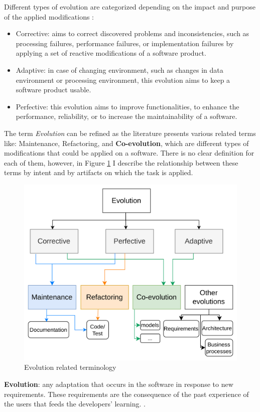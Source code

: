 Different types of evolution are categorized depending on the impact and purpose of the applied modifications \cite{lientz1980software,Swanson1976}:
\begin{itemize}
	
	\item  Corrective: aims to correct discovered problems and inconsistencies, such as processing failures, performance failures, or implementation failures by applying a set of reactive modifications of a software product.  
	
	\item  Adaptive: in case of changing environment, such as changes in data environment or processing environment, this evolution aims to keep a software product usable.
	
	\item Perfective: this evolution aims to improve functionalities, to enhance the performance, reliability, or to increase the maintainability of a software.  
	
\end{itemize}
The term \textit{Evolution} can be refined as the literature presents various related terms like: Maintenance, Refactoring, and \textbf{Co-evolution}, which are different types of modifications that could be applied on a software. There is no clear definition for each of them, however, in Figure \ref{fig:evolutiontypes} I describe the relationship between these terms by intent and by artifacts on which the task is applied.


\begin{figure}[t]
	\begin{center}
		\includegraphics[width=0.6\linewidth]{./pics/soaPics/evolutiontypes.png}
	\end{center}
	\caption{Evolution related terminology}
	\label{fig:evolutiontypes}
\end{figure}
\textbf{Evolution}: any adaptation that occurs in the software in response to new requirements. These requirements are the consequence of the past experience of the users that feeds the developers' learning. \cite{bennett2000software}. 

